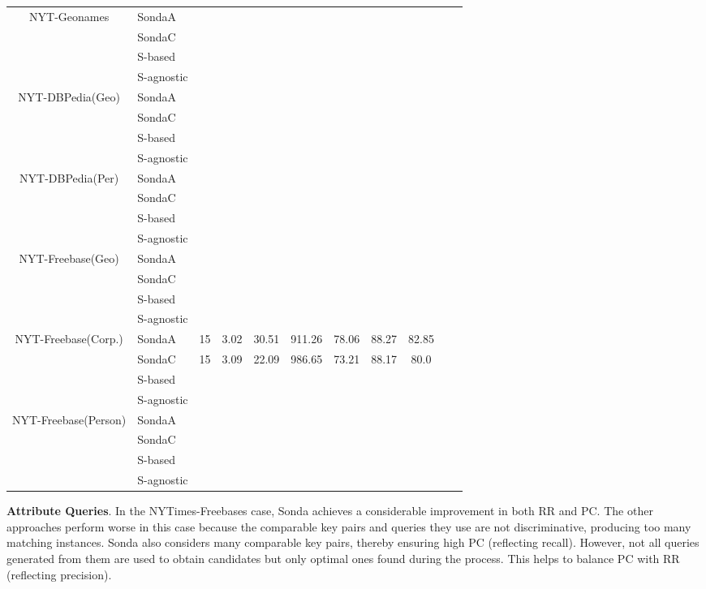 \begin{center}
\begin{table*}[ht]
\begin{tabular}{|c|l|c|c|c|c|c|c|c|c|c|}
\multirow{4}{*}{NYT-Geonames} & SondaA   \\
											& SondaC  \\
											& S-based    \\
 											& S-agnostic     \\ \hline 											


\multirow{4}{*}{NYT-DBPedia(Geo)} & SondaA    \\
											& SondaC  \\
											& S-based \\
 											& S-agnostic       \\ \hline 											
 		
\multirow{4}{*}{NYT-DBPedia(Per)} & SondaA   \\
											& SondaC  \\
											& S-based  \\
 											& S-agnostic       \\ \hline 											
 		
 		
\multirow{4}{*}{NYT-Freebase(Geo)} & SondaA    \\
											& SondaC  \\
											& S-based   \\
 											& S-agnostic        \\ \hline 											
 
 

\multirow{4}{*}{NYT-Freebase(Corp.)} & SondaA   & 15 & 3.02   & 30.51  & 911.26  & 78.06 & 88.27 & 82.85   \\
											 & SondaC   & 15 & 3.09   & 22.09  & 986.65  & 73.21 & 88.17 & 80.0\\
											& S-based    \\
 											& S-agnostic          \\ \hline 					
 											
\multirow{4}{*}{NYT-Freebase(Person)} & SondaA  \\
											& SondaC  \\
											& S-based      \\
 											& S-agnostic       \\ \hline 								

\end{tabular}  
\end{table*} 
\end{center}

 
\textbf{Attribute Queries}. In the NYTimes-Freebases case, Sonda achieves a considerable improvement in both RR and PC. The other approaches perform worse in this case because the comparable key pairs and queries they use are not discriminative, producing too many matching instances. Sonda also considers many comparable key pairs, thereby ensuring high PC (reflecting recall). However, not all queries generated from them are used to obtain candidates but only optimal ones found during the process. This helps to balance PC with RR (reflecting precision). 

